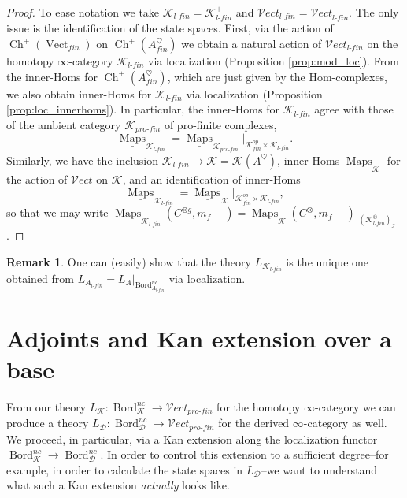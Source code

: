 \documentclass[reqno]{amsart}
\theoremstyle{definition}
\newtheorem{remark}[lemma]{Remark}
\newcommand{\mcl}[1]{\mathcal{#1}}
\newcommand{\msc}[1]{\mathscr{#1}}
\newcommand{\opn}[1]{\operatorname{#1}}
\newcommand{\ot}{\otimes}
\newcommand{\Vect}{\msc{V}\!ect}
\newcommand{\pf}{pro\text{-}fin}
\DeclareMathOperator{\Maps}{Maps}
\DeclareMathOperator{\Bord}{Bord}
\renewcommand{\1}{\mathbf{1}}
\begin{document}
\begin{proof}
To ease notation we take $\msc{K}_{l\text{-}fin}=\msc{K}_{l\text{-}fin}^+$ and $\Vect_{l\text{-}fin}=\Vect^+_{l\text{-}fin}$. The only issue is the identification of the state spaces.  First, via the action of $\opn{Ch}^+(\opn{Vect}_{fin})$ on $\opn{Ch}^+(A^{\heartsuit}_{fin})$ we obtain a natural action of $\Vect_{l\text{-}fin}$ on the homotopy $\infty$-category $\msc{K}_{l\text{-}fin}$ via localization (Proposition \ref{prop:mod_loc}).  From the inner-Homs for $\opn{Ch}^+(A^{\heartsuit}_{fin})$, which are just given by the Hom-complexes, we also obtain inner-Homs for $\msc{K}_{l\text{-}fin}$ via localization (Proposition \ref{prop:loc_innerhoms}).  In particular, the inner-Homs for $\msc{K}_{l\text{-}fin}$ agree with those of the ambient category $\msc{K}_{\pf}$ of pro-finite complexes,
\[
\underline{\Maps}_{\msc{K}_{l\text{-}fin}}= \underline{\Maps}_{\msc{K}_{\pf}}|_{\msc{K}_{fin}^{op}\times \msc{K}_{l\text{-}fin}}.
\]
Similarly, we have the inclusion $\msc{K}_{l\text{-}fin}\to \msc{K}=\msc{K}(A^{\heartsuit})$, inner-Homs $\underline{\Maps}_{\msc{K}}$ for the action of $\Vect$ on $\msc{K}$, and an identification of inner-Homs
\[
\underline{\Maps}_{\msc{K}_{l\text{-}fin}}= \underline{\Maps}_{\msc{K}}|_{\msc{K}_{fin}^{op}\times \msc{K}_{l\text{-}fin}},
\]
so that we may write $\underline{\Maps}_{\msc{K}_{l\text{-}fin}}(C^{\ot g},m_f-)=\underline{\Maps}_{\msc{K}}(C^{\ot},m_f-)|_{(\msc{K}_{l\text{-}fin}^{\ot})_{\mcl{I}}}$.
\end{proof}

\begin{remark}
One can (easily) show that the theory $L_{\msc{K}_{l\text{-}fin}}$ is the unique one obtained from $L_{A_{l\text{-}fin}}=L_A|_{\Bord_{A_{l\text{-}fin}}^{nc}}$ via localization.
\end{remark}

\section{Adjoints and Kan extension over a base}
\label{sect:rel_adj_kan}

From our theory $L_{\msc{K}}:\Bord_{\msc{K}}^{nc}\to \Vect_{\pf}$ for the homotopy $\infty$-category we can produce a theory $L_{\msc{D}}:\Bord_{\msc{D}}^{nc}\to \Vect_{\pf}$ for the derived $\infty$-category as well.  We proceed, in particular, via a Kan extension along the localization functor $\Bord_{\msc{K}}^{nc}\to \Bord_{\msc{D}}^{nc}$.  In order to control this extension to a sufficient degree--for example, in order to calculate the state spaces in $L_{\msc{D}}$--we want to understand what such a Kan extension \emph{actually} looks like.
\par
\end{document}
